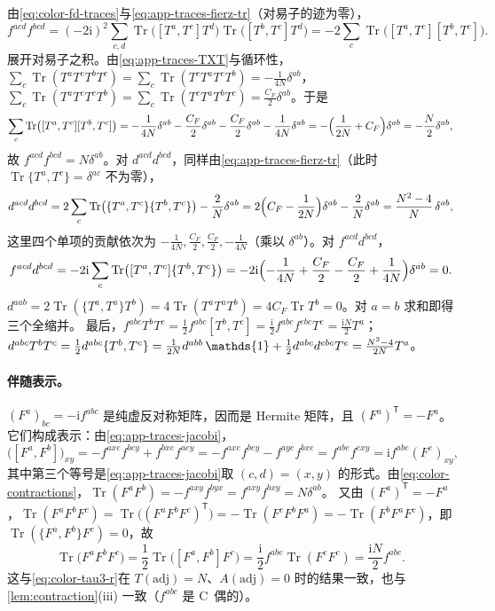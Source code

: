 \documentclass[UTF8,a4paper,11pt,fontset=fandol]{ctexart}
\makeatletter
\let\amsmathbb\mathbb
\renewcommand{\mathbb}[1]{\ifx1#1\mathds{1}\else\amsmathbb{#1}\fi}
\theoremstyle{cplain}
\theoremstyle{cdefinition}
\theoremstyle{cremark}
\renewcommand{\proofname}{证明}
\renewenvironment{proof}[1][\proofname]{\par\pushQED{\qed}\normalfont\topsep6\p@\@plus6\p@\relax
  \trivlist\item[\hskip\labelsep\itshape #1\hspace{0.5em}]\ignorespaces}{\popQED\endtrivlist\@endpefalse}
\numberwithin{equation}{section}
\DeclareMathOperator{\Tr}{Tr}
\newcommand{\tp}{\mathsf{T}}                         %
\newcommand{\ii}{\mathrm{i}}                        %
\makeatother
\begin{document}
\begin{proof}
由\cref{eq:color-fd-traces}与\cref{eq:app-traces-fierz-tr}（对易子的迹为零），
\[
f^{acd}f^{bcd}=(-2\ii)^2\sum_{c,d}\Tr\bigl([T^a,T^c]T^d\bigr)\Tr\bigl([T^b,T^c]T^d\bigr)=-2\sum_c\Tr\bigl([T^a,T^c][T^b,T^c]\bigr).
\]
展开对易子之积。由\cref{eq:app-traces-TXT}与循环性，$\sum_c\Tr(T^aT^cT^bT^c)=\sum_c\Tr(T^cT^aT^cT^b)=-\frac{1}{4N}\delta^{ab}$，
$\sum_c\Tr(T^aT^cT^cT^b)=\sum_c\Tr(T^cT^aT^bT^c)=\frac{C_F}2\delta^{ab}$。于是
\[
\sum_c\Tr\bigl([T^a,T^c][T^b,T^c]\bigr)=-\frac{1}{4N}\delta^{ab}-\frac{C_F}2\delta^{ab}-\frac{C_F}2\delta^{ab}-\frac{1}{4N}\delta^{ab}=-\Bigl(\frac1{2N}+C_F\Bigr)\delta^{ab}=-\frac N2\delta^{ab},
\]
故 $f^{acd}f^{bcd}=N\delta^{ab}$。对 $d^{acd}d^{bcd}$，同样由\cref{eq:app-traces-fierz-tr}（此时 $\Tr\{T^a,T^c\}=\delta^{ac}$ 不为零），
\[
d^{acd}d^{bcd}=2\sum_c\Tr\bigl(\{T^a,T^c\}\{T^b,T^c\}\bigr)-\frac2N\delta^{ab}
=2\Bigl(C_F-\frac1{2N}\Bigr)\delta^{ab}-\frac2N\delta^{ab}=\frac{N^2-4}{N}\,\delta^{ab},
\]
这里四个单项的贡献依次为 $-\frac{1}{4N},\frac{C_F}{2},\frac{C_F}{2},-\frac1{4N}$（乘以 $\delta^{ab}$）。对 $f^{acd}d^{bcd}$，
\[
f^{acd}d^{bcd}=-2\ii\sum_c\Tr\bigl([T^a,T^c]\{T^b,T^c\}\bigr)=-2\ii\Bigl(-\frac1{4N}+\frac{C_F}2-\frac{C_F}2+\frac1{4N}\Bigr)\delta^{ab}=0 .
\]
$d^{aab}=2\Tr(\{T^a,T^a\}T^b)=4\Tr(T^aT^aT^b)=4C_F\Tr T^b=0$。对 $a=b$ 求和即得三个全缩并。
最后，$f^{abc}T^bT^c=\frac12f^{abc}[T^b,T^c]=\frac{\ii}2f^{abc}f^{ebc}T^e=\frac{\ii N}2T^a$；
$d^{abc}T^bT^c=\frac12d^{abc}\{T^b,T^c\}=\frac1{2N}d^{abb}\,\mathbb 1+\frac12d^{abc}d^{ebc}T^e=\frac{N^2-4}{2N}T^a$。
\end{proof}

\paragraph{伴随表示。}$(F^a)_{bc}=-\ii f^{abc}$ 是纯虚反对称矩阵，因而是 Hermite 矩阵，且 $(F^a)^{\tp}=-F^a$。
它们构成表示：由\cref{eq:app-traces-jacobi}，
\[
\bigl([F^a,F^b]\bigr)_{xy}=-f^{axe}f^{bey}+f^{bxe}f^{aey}=-f^{axe}f^{bey}-f^{aye}f^{bxe}=f^{abe}f^{exy}=\ii f^{abe}(F^e)_{xy},
\]
其中第三个等号是\cref{eq:app-traces-jacobi}取 $(c,d)=(x,y)$ 的形式。由\cref{eq:color-contractions}，$\Tr(F^aF^b)=-f^{axy}f^{byx}=f^{axy}f^{bxy}=N\delta^{ab}$。
又由 $(F^a)^{\tp}=-F^a$，$\Tr(F^aF^bF^c)=\Tr\bigl((F^aF^bF^c)^{\tp}\bigr)=-\Tr(F^cF^bF^a)=-\Tr(F^bF^aF^c)$，即 $\Tr(\{F^a,F^b\}F^c)=0$，故
\begin{equation}\label{eq:app-traces-FFF}
\Tr\bigl(F^aF^bF^c\bigr)=\frac12\Tr\bigl([F^a,F^b]F^c\bigr)=\frac{\ii}2f^{abe}\Tr(F^eF^c)=\frac{\ii N}{2}f^{abc}.
\end{equation}
这与\cref{eq:color-tau3-r}在 $T(\mathrm{adj})=N$、$A(\mathrm{adj})=0$ 时的结果一致，也与\cref{lem:contraction}(iii) 一致（$f^{abc}$ 是 C~偶的）。
\end{document}
